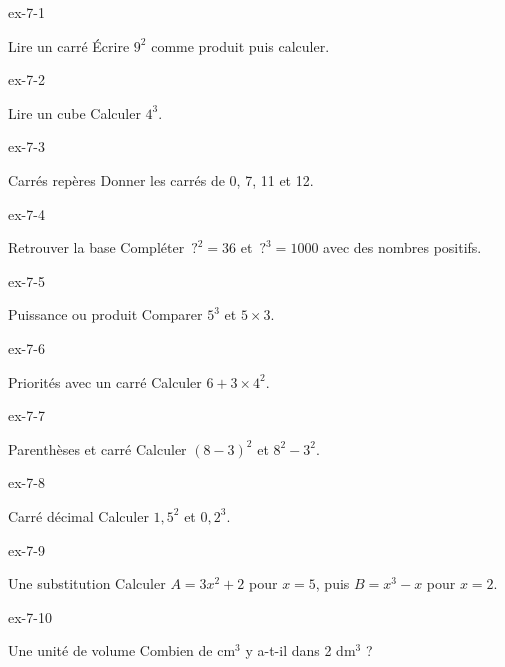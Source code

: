 \clearpage{}
\begin{blocLivre}{ex-7-1}\begin{exercice}[1]{Lire un carré}
Écrire $9^2$ comme produit puis calculer.
\end{exercice}\end{blocLivre}
\begin{blocLivre}{ex-7-2}\begin{exercice}[1]{Lire un cube}
Calculer $4^3$.
\end{exercice}\end{blocLivre}
\begin{blocLivre}{ex-7-3}\begin{exercice}[1]{Carrés repères}
Donner les carrés de 0, 7, 11 et 12.
\end{exercice}\end{blocLivre}
\begin{blocLivre}{ex-7-4}\begin{exercice}[1]{Retrouver la base}
Compléter $\,?^2=36$ et $\,?^3=1000$ avec des nombres positifs.
\end{exercice}\end{blocLivre}
\begin{blocLivre}{ex-7-5}\begin{exercice}[1]{Puissance ou produit}
Comparer $5^3$ et $5\times3$.
\end{exercice}\end{blocLivre}

\begin{blocLivre}{ex-7-6}\begin{exercice}[2]{Priorités avec un carré}
Calculer $6+3\times4^2$.
\end{exercice}\end{blocLivre}
\begin{blocLivre}{ex-7-7}\begin{exercice}[2]{Parenthèses et carré}
Calculer $(8-3)^2$ et $8^2-3^2$.
\end{exercice}\end{blocLivre}
\begin{blocLivre}{ex-7-8}\begin{exercice}[2]{Carré décimal}
Calculer $1{,}5^2$ et $0{,}2^3$.
\end{exercice}\end{blocLivre}
\begin{blocLivre}{ex-7-9}\begin{exercice}[2]{Une substitution}
Calculer $A=3x^2+2$ pour $x=5$, puis $B=x^3-x$ pour $x=2$.
\end{exercice}\end{blocLivre}
\begin{blocLivre}{ex-7-10}\begin{exercice}[2]{Une unité de volume}
Combien de cm$^3$ y a-t-il dans 2 dm$^3$ ?
\end{exercice}\end{blocLivre}

